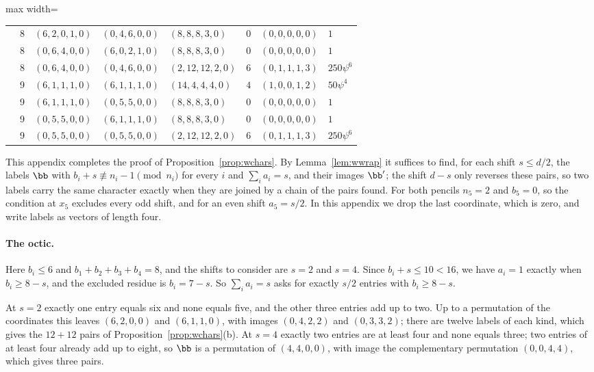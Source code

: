\begin{table}[t]
\begin{adjustbox}{max width=\linewidth}
\begin{tabular}{lrlllrll}
 & 8 & $(6,2,0,1,0)$ & $(0,4,6,0,0)$ & $(8,8,8,3,0)$ & $0$ & $(0,0,0,0,0)$ & $1$\\
 & 8 & $(0,6,4,0,0)$ & $(6,0,2,1,0)$ & $(8,8,8,3,0)$ & $0$ & $(0,0,0,0,0)$ & $1$\\
 & 8 & $(0,6,4,0,0)$ & $(0,4,6,0,0)$ & $(2,12,12,2,0)$ & $6$ & $(0,1,1,1,3)$ & $250\psi^{6}$\\
 & 9 & $(6,1,1,1,0)$ & $(6,1,1,1,0)$ & $(14,4,4,4,0)$ & $4$ & $(1,0,0,1,2)$ & $50\psi^{4}$\\
 & 9 & $(6,1,1,1,0)$ & $(0,5,5,0,0)$ & $(8,8,8,3,0)$ & $0$ & $(0,0,0,0,0)$ & $1$\\
 & 9 & $(0,5,5,0,0)$ & $(6,1,1,1,0)$ & $(8,8,8,3,0)$ & $0$ & $(0,0,0,0,0)$ & $1$\\
 & 9 & $(0,5,5,0,0)$ & $(0,5,5,0,0)$ & $(2,12,12,2,0)$ & $6$ & $(0,1,1,1,3)$ & $250\psi^{6}$\\
\bottomrule
\end{tabular}\end{adjustbox}
\end{table}

This appendix completes the proof of Proposition~\ref{prop:wchars}. By
Lemma~\ref{lem:wwrap} it suffices to find, for each shift $s\le d/2$, the
labels $\bb$ with $b_i+s\not\equiv n_i-1\pmod{n_i}$ for every $i$ and
$\sum_ia_i=s$, and their images $\bb'$; the shift $d-s$ only reverses
these pairs, so two labels carry the same character exactly when they are
joined by a chain of the pairs found. For both pencils $n_5=2$ and
$b_5=0$, so the condition at $x_5$ excludes every odd shift, and for an
even shift $a_5=s/2$. In this appendix we drop the last coordinate, which
is zero, and write labels as vectors of length four.

\paragraph*{The octic.}
Here $b_i\le6$ and $b_1+b_2+b_3+b_4=8$, and the shifts to consider are
$s=2$ and $s=4$. Since $b_i+s\le10<16$, we have $a_i=1$ exactly when
$b_i\ge8-s$, and the excluded residue is $b_i=7-s$. So $\sum_ia_i=s$ asks
for exactly $s/2$ entries with $b_i\ge8-s$.

At $s=2$ exactly one entry equals six and none equals five, and the other
three entries add up to two. Up to a permutation of the coordinates this
leaves $(6,2,0,0)$ and $(6,1,1,0)$, with images $(0,4,2,2)$ and
$(0,3,3,2)$; there are twelve labels of each kind, which gives the $12+12$
pairs of Proposition~\ref{prop:wchars}(b). At $s=4$ exactly two entries are
at least four and none equals three; two entries of at least four already
add up to eight, so $\bb$ is a permutation of $(4,4,0,0)$, with image the
complementary permutation $(0,0,4,4)$, which gives three pairs.

